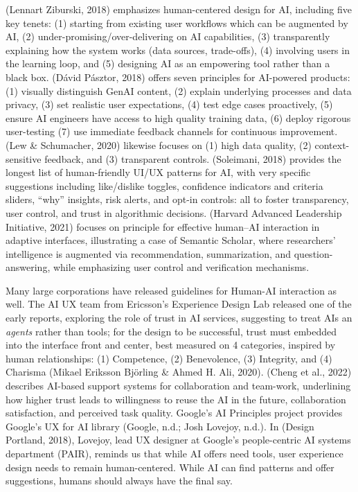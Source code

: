 \documentclass[
  letterpaper,
  DIV=11,
  numbers=noendperiod]{scrartcl}
\begin{document}
(Lennart Ziburski, 2018) emphasizes human-centered design for AI,
including five key tenets: (1) starting from existing user workflows
which can be augmented by AI, (2) under-promising/over-delivering on AI
capabilities, (3) transparently explaining how the system works (data
sources, trade-offs), (4) involving users in the learning loop, and (5)
designing AI as an empowering tool rather than a black box. (Dávid
Pásztor, 2018) offers seven principles for AI-powered products: (1)
visually distinguish GenAI content, (2) explain underlying processes and
data privacy, (3) set realistic user expectations, (4) test edge cases
proactively, (5) ensure AI engineers have access to high quality
training data, (6) deploy rigorous user-testing (7) use immediate
feedback channels for continuous improvement. (Lew \& Schumacher, 2020)
likewise focuses on (1) high data quality, (2) context-sensitive
feedback, and (3) transparent controls. (Soleimani, 2018) provides the
longest list of human-friendly UI/UX patterns for AI, with very specific
suggestions including like/dislike toggles, confidence indicators and
criteria sliders, ``why'' insights, risk alerts, and opt-in controls:
all to foster transparency, user control, and trust in algorithmic
decisions. (Harvard Advanced Leadership Initiative, 2021) focuses on
principle for effective human--AI interaction in adaptive interfaces,
illustrating a case of Semantic Scholar, where researchers' intelligence
is augmented via recommendation, summarization, and question-answering,
while emphasizing user control and verification mechanisms.

Many large corporations have released guidelines for Human-AI
interaction as well. The AI UX team from Ericsson's Experience Design
Lab released one of the early reports, exploring the role of trust in AI
services, suggesting to treat AIs an \emph{agents} rather than tools;
for the design to be successful, trust must embedded into the interface
front and center, best measured on 4 categories, inspired by human
relationships: (1) Competence, (2) Benevolence, (3) Integrity, and (4)
Charisma (Mikael Eriksson Björling \& Ahmed H. Ali, 2020). (Cheng et
al., 2022) describes AI-based support systems for collaboration and
team-work, underlining how higher trust leads to willingness to reuse
the AI in the future, collaboration satisfaction, and perceived task
quality. Google's AI Principles project provides Google's UX for AI
library (Google, n.d.; Josh Lovejoy, n.d.). In (Design Portland, 2018),
Lovejoy, lead UX designer at Google's people-centric AI systems
department (PAIR), reminds us that while AI offers need tools, user
experience design needs to remain human-centered. While AI can find
patterns and offer suggestions, humans should always have the final say.
\end{document}
